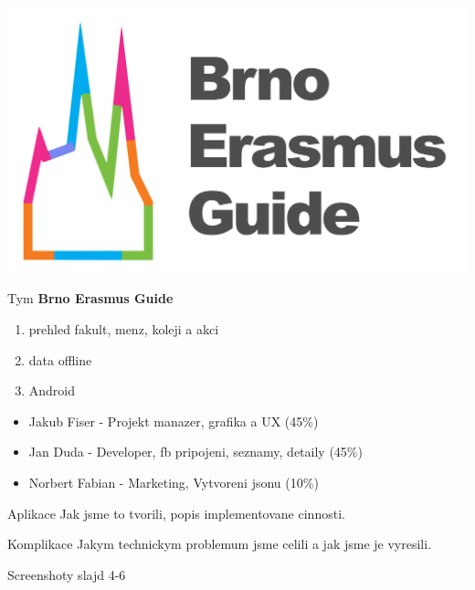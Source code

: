 \documentclass[pdf]{beamer}
\begin{document}
\begin{frame}
  \begin{center}
    \includegraphics[scale=0.13]{app_menu_header}
  \titlepage
  \end{center}
\end{frame}

\begin{frame}{Tym}
  \textbf{Brno Erasmus Guide}
  \begin{enumerate}
      \item prehled fakult, menz, koleji a akci
      \item data offline
      \item Android
  \end{enumerate}

  \begin{itemize}
      \item Jakub Fiser - Projekt manazer, grafika a UX (45\%)
      \item Jan Duda - Developer, fb pripojeni, seznamy, detaily (45\%)
      \item Norbert Fabian - Marketing, Vytvoreni jsonu (10\%)
  \end{itemize}
\end{frame}

\begin{frame}{Aplikace}
  Jak jsme to tvorili, popis implementovane cinnosti.
\end{frame}

\begin{frame}{Komplikace}
 Jakym technickym problemum jsme celili a jak jsme je vyresili.
\end{frame}

\begin{frame}{Screenshoty}
 slajd 4-6
\end{frame}
\end{document}
